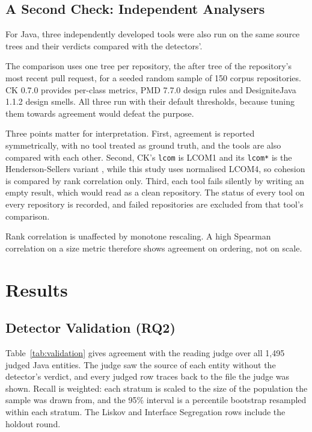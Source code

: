 \subsection{A Second Check: Independent Analysers}
\label{sec:validation-independent}

For Java, three independently developed tools were also run on the same source trees and their
verdicts compared with the detectors'.

The comparison uses one tree per repository, the after tree of the repository's most recent pull
request, for a seeded random sample of 150 corpus repositories. CK 0.7.0 provides per-class metrics,
PMD 7.7.0 design rules and DesigniteJava 1.1.2 design smells. All three run with their default
thresholds, because tuning them towards agreement would defeat the purpose.

Three points matter for interpretation. First, agreement is reported symmetrically, with no tool
treated as ground truth, and the tools are also compared with each other. Second, CK's
\texttt{lcom} is LCOM1 and its \texttt{lcom*} is the Henderson-Sellers variant
\citep{hendersonsellers1996metrics}, while this study uses normalised LCOM4, so cohesion is compared
by rank correlation only. Third, each tool fails silently by writing an empty result, which would
read as a clean repository. The status of every tool on every repository is recorded, and failed
repositories are excluded from that tool's comparison.

Rank correlation is unaffected by monotone rescaling. A high Spearman correlation on a size metric
therefore shows agreement on ordering, not on scale.

\section{Results}
\label{sec:results}

\subsection{Detector Validation (RQ2)}
\label{sec:instrument-validation}
\label{sec:construct-validity}

Table~\ref{tab:validation} gives agreement with the reading judge over all 1{,}495 judged Java
entities. The judge saw the source of each entity without the detector's verdict, and every judged
row traces back to the file the judge was shown. Recall is weighted: each stratum is scaled to the
size of the population the sample was drawn from, and the 95\% interval is a percentile bootstrap
resampled within each stratum. The Liskov and Interface Segregation rows include the holdout
round.

